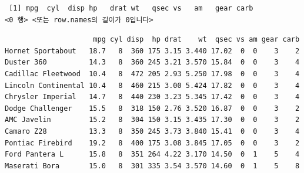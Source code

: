 \documentclass[
  11pt,
]{krantz}
\newenvironment{Shaded}{\begin{snugshade}}{\end{snugshade}}
\newcommand{\CommentTok}[1]{\textcolor[rgb]{0.37,0.37,0.37}{\textit{#1}}}
\newcommand{\DecValTok}[1]{\textcolor[rgb]{0.06,0.06,0.06}{#1}}
\newcommand{\KeywordTok}[1]{\textcolor[rgb]{0.27,0.27,0.27}{\textbf{#1}}}
\newcommand{\NormalTok}[1]{#1}
\newcommand{\OperatorTok}[1]{\textcolor[rgb]{0.43,0.43,0.43}{\textbf{#1}}}
\newcommand{\StringTok}[1]{\textcolor[rgb]{0.5,0.5,0.5}{#1}}
\begin{document}
\footnotesize

\begin{Shaded}
\end{Shaded}

\begin{verbatim}
 [1] mpg  cyl  disp hp   drat wt   qsec vs   am   gear carb
<0 행> <또는 row.names의 길이가 0입니다>
\end{verbatim}

\begin{Shaded}
\end{Shaded}

\begin{verbatim}
                     mpg cyl disp  hp drat    wt  qsec vs am gear carb
Hornet Sportabout   18.7   8  360 175 3.15 3.440 17.02  0  0    3    2
Duster 360          14.3   8  360 245 3.21 3.570 15.84  0  0    3    4
Cadillac Fleetwood  10.4   8  472 205 2.93 5.250 17.98  0  0    3    4
Lincoln Continental 10.4   8  460 215 3.00 5.424 17.82  0  0    3    4
Chrysler Imperial   14.7   8  440 230 3.23 5.345 17.42  0  0    3    4
Dodge Challenger    15.5   8  318 150 2.76 3.520 16.87  0  0    3    2
AMC Javelin         15.2   8  304 150 3.15 3.435 17.30  0  0    3    2
Camaro Z28          13.3   8  350 245 3.73 3.840 15.41  0  0    3    4
Pontiac Firebird    19.2   8  400 175 3.08 3.845 17.05  0  0    3    2
Ford Pantera L      15.8   8  351 264 4.22 3.170 14.50  0  1    5    4
Maserati Bora       15.0   8  301 335 3.54 3.570 14.60  0  1    5    8
\end{verbatim}

\begin{Shaded}
\end{Shaded}
\end{document}
